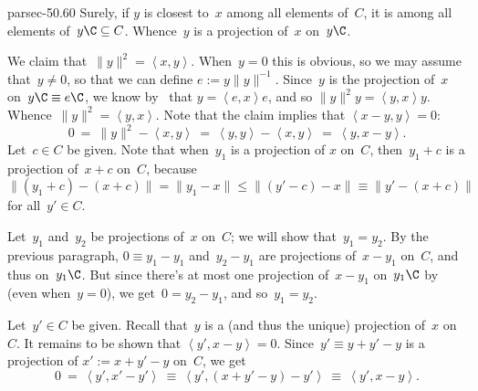 \documentclass[b5page]{book}
\begin{document}
\begin{solution}{parsec-50.60}%
Surely, if $y$ is closest to~$x$
among all elements of~$C$,
it is among all elements of~$y\C\subseteq C$.
Whence~$y$ is a projection of~$x$ on~$y\C$.

We claim that~$\|y\|^2 = \left<x,y\right>$.  When~$y=0$
    this is obvious, so we may assume that~$y\neq 0$,
    so that we can define $e:= y\|y\|^{-1}$.
Since~$y$ is the projection of~$x$ on~$y\C\equiv e\C$,
we know by~ that
$y=\left<e,x\right>e$,
and so $\|y\|^2 y = \left<y,x\right>y$.
Whence~$\|y\|^2 = \left<y,x\right>$.
Note that the claim implies that $\left<x-y,y\right>=0$:
\begin{equation*}
0\ =\ \|y\|^2-\left<x,y\right> \ =\  \left<y,y\right>-\left<x,y\right>
\ =\  \left<y,x-y\right>.
\end{equation*}
Let~$c\in C$ be given.
Note that when~$y_1$ is a projection of
    $x$ on~$C$, then~$y_1+c$ is a projection
of~$x+c$ on~$C$, because
    $\|(y_1+c)-(x+c)\|=\|y_1-x\|\leq \|(y'-c)-x\|\equiv \|y'-(x+c)\|$
    for all~$y'\in C$.

Let~$y_1$ and~$y_2$ be projections of~$x$ on~$C$;
we will show that~$y_1=y_2$.
By the previous paragraph,
$0\equiv y_1-y_1$ and~$y_2-y_1$ are projections of~$x-y_1$ on~$C$,
and thus on~$y_1\C$.
But since there's at most one projection of~$x-y_1$ on~$y_1\C$
    by~ (even when~$y=0$),
    we get~$0=y_2-y_1$, and so~$y_1=y_2$.

Let~$y'\in C$ be given.
Recall that~$y$ is a (and thus the unique) projection of~$x$
on~$C$. It remains to be shown that
$\left<y',x-y\right>=0$.
Since~$y' \equiv y+y'-y$ is a projection
of $x':=x+y'-y$ on~$C$,
    we get 
\begin{equation*}
0\ =\ \left<y',x'-y'\right>\ \equiv \ 
    \left<y',(x+y'-y)-y'\right>\ \equiv\  \left<y',x-y\right>.
\end{equation*}
\end{solution}
\end{document}
